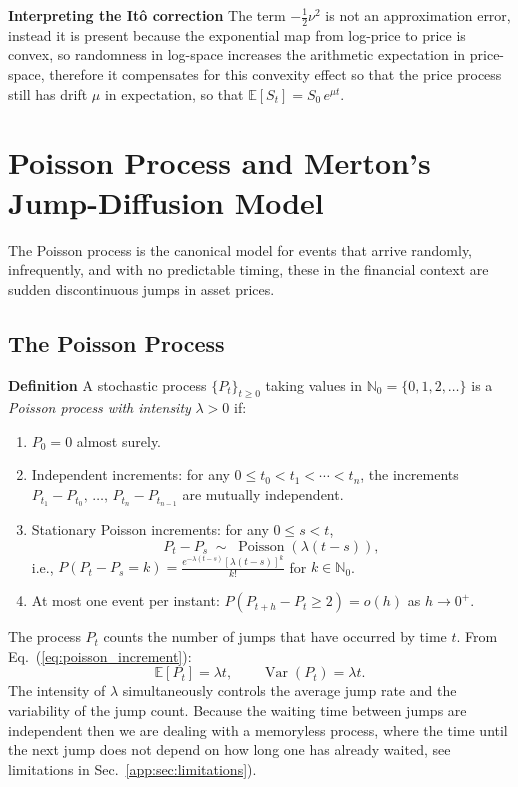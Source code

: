 \textbf{Interpreting the It\^{o} correction} \quad The term $-\frac{1}{2}\nu^2$ is
not an approximation error, instead it is present because the exponential map from log-price to price is convex, so randomness in log-space increases the arithmetic expectation in price-space, therefore it compensates for this convexity effect so that the price process still has drift \(\mu\) in expectation, so that \(\mathbb{E}[S_t]=S_0\, e^{\mu t}\).

\section{Poisson Process and Merton's Jump-Diffusion Model}
\label{app:sec:poisson_merton}

The Poisson process is the canonical model for events that arrive randomly,
infrequently, and with no predictable timing, these in the financial context are sudden
discontinuous jumps in asset prices.

\subsection{The Poisson Process}

\textbf{Definition} A stochastic process $\{P_t\}_{t \geq 0}$ taking values in
$\mathbb{N}_0 = \{0, 1, 2, \ldots\}$ is a \textit{Poisson process with intensity}
$\lambda > 0$ if:
\begin{enumerate}
    \item $P_0 = 0$ almost surely.
    \item Independent increments: for any $0 \leq t_0 < t_1 < \cdots < t_n$,
    the increments $P_{t_1} - P_{t_0},\, \ldots,\, P_{t_n} - P_{t_{n-1}}$ are
    mutually independent.
    \item Stationary Poisson increments: for any $0 \leq s < t$,
    \begin{equation}
        \label{eq:poisson_increment}
        P_t - P_s \;\sim\; \operatorname{Poisson}(\lambda(t - s)),
    \end{equation}
    i.e., $P(P_t - P_s = k) = \frac{e^{-\lambda(t-s)}[\lambda(t-s)]^k}{k!}$
    for $k \in \mathbb{N}_0$.
    \item At most one event per instant: $P(P_{t+h} - P_t \geq 2) = o(h)$
    as $h \to 0^+$.
\end{enumerate}

The process $P_t$ counts the number of jumps that have occurred by time $t$.
From Eq.~(\ref{eq:poisson_increment}):
\[
    \mathbb{E}[P_t] = \lambda t, \qquad \operatorname{Var}(P_t) = \lambda t.
\]
The intensity of $\lambda$ simultaneously controls the average jump rate and the variability of the jump count. Because the waiting time between jumps are independent then we are dealing with a memoryless process, where the time until the next jump does not depend on how long
one has already waited, see limitations in Sec.\ \ref{app:sec:limitations}).

